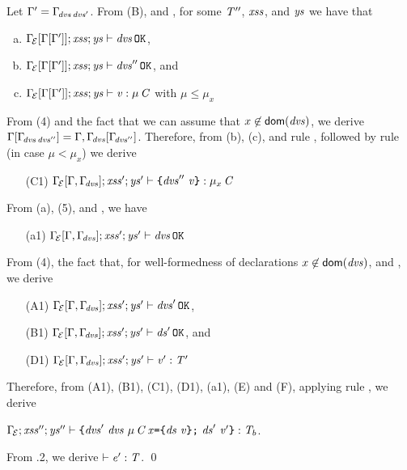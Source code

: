 Let $\Gamma'=\Gamma_{\!\mathit{dvs}\,\mathit{dvs}'}$. From (B), and , for some $\mathit{T}''$, $\mathit{xss}$, and $\mathit{ys}$
we have that
\begin{enumerate} [(a)]
\item ${\Gamma_{\!{\cal{E}}}[\Gamma[\Gamma']]};\mathit{xss};\mathit{ys}\vdash \mathit{dvs}\,{\tt OK}$,
\item ${\Gamma_{\!{\cal{E}}}[\Gamma[\Gamma']]};\mathit{xss};\mathit{ys}\vdash \mathit{dvs}''\,{\tt OK}$, and
\item ${\Gamma_{\!{\cal{E}}}[\Gamma[\Gamma']]};\mathit{xss};\mathit{ys}\vdash \mathit{v}:\mu\,\mathit{C}
$ with $\mu\leq\mu_x$
\end{enumerate}
From (4) and the fact that we can assume that $x\not\in\textsf{dom}(\mathit{dvs})$, we derive
$\Gamma[\Gamma_{\!\mathit{dvs}\,\mathit{dvs}''}]=\Gamma,\Gamma_{\!\mathit{dvs}}[\Gamma_{\!\mathit{dvs}''}]$.
Therefore, from (b), (c), and rule , followed by rule  (in case $\mu<\mu_x$) we derive
\begin{itemize}
\item [(C1)] ${\Gamma_{\!{\cal{E}}}[\Gamma,\Gamma_{\!\mathit{dvs}}]};\mathit{xss}';\mathit{ys}'\vdash {\texttt{\{}\mathit{dvs}''\ \mathit{v}\texttt{\}}}:\mu_x\,\mathit{C}
$
\end{itemize}
From (a), (5), and , we have
\begin{itemize}
\item [(a1)] ${\Gamma_{\!{\cal{E}}}[{\Gamma,\Gamma_{\!\mathit{dvs}}}]};\mathit{xss}';\mathit{ys}'\vdash \mathit{dvs}\,{\tt OK}$
\end{itemize}
From (4), {the fact that, for well-formedness of
declarations $x\not\in\textsf{dom}(\mathit{dvs})$}, and , we derive
\begin{itemize}
\item [(A1)] ${\Gamma_{\!{\cal{E}}}[\Gamma,\Gamma_{\!\mathit{dvs}}]};\mathit{xss}';\mathit{ys}'\vdash \mathit{dvs}'\,{\tt OK}$,
\item [(B1)] ${\Gamma_{\!{\cal{E}}}[\Gamma,\Gamma_{\!\mathit{dvs}}]};\mathit{xss}';\mathit{ys}'\vdash \mathit{ds}'\,{\tt OK}$, and
\item [(D1)] $\Gamma_{\!{\cal{E}}}[\Gamma,\Gamma_{\!\mathit{dvs}}];\mathit{xss}';\mathit{ys}'\vdash \mathit{v}':\mathit{T}'$
\end{itemize}
Therefore, from (A1), (B1), (C1), (D1), (a1), (E) and (F), applying rule , we derive
\begin{center}
$\TypeCheck{{\TypeEnv{\ctx}}}{\LentLocked''}{\StronglyLocked''}{\Block{\dvs'\ \dvs\ \Dec{\Type{\mu}{\C}}{\x}{\Block{\decs}{\val}}\ \decs'}{\val'}}{\T_b}$.
\end{center}
From .2, we derive $\vdash \mathit{e}':\mathit{T}$.
\qed

